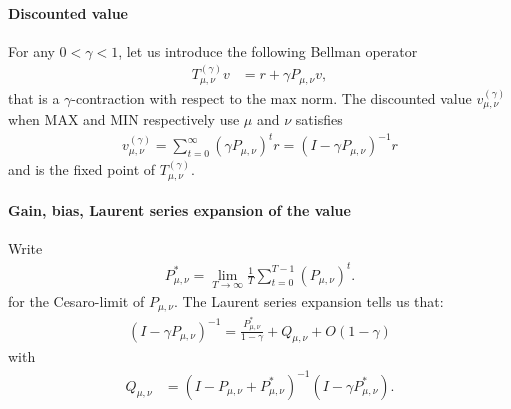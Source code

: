 \documentclass{article}
\begin{document}
\paragraph{Discounted value}

For any $0<\gamma<1$, let us introduce the following Bellman operator
\begin{align}
  T^{(\gamma)}_{\mu,\nu}v &= r + \gamma P_{\mu,\nu}v,%
\end{align}
that is a $\gamma$-contraction with respect to the max norm.
The discounted value $v^{(\gamma)}_{\mu,\nu}$ when MAX and MIN respectively use $\mu$ and $\nu$ satisfies
\begin{align}
  v^{(\gamma)}_{\mu,\nu} = \sum_{t=0}^{\infty} (\gamma P_{\mu,\nu})^t r = (I-\gamma P_{\mu,\nu})^{-1} r
\end{align}
and is the fixed point of $T^{(\gamma)}_{\mu,\nu}$.

\paragraph{Gain, bias, Laurent series expansion of the value} 

Write
\begin{align}
P_{\mu,\nu}^* = \lim_{T \to \infty} \frac{1}{T}\sum_{t=0}^{T-1} (P_{\mu,\nu})^t. 
\end{align}
for the Cesaro-limit of $P_{\mu,\nu}$.
The Laurent series expansion \cite[Appendix A]{puterman} tells us that: 
\begin{align}
(I-\gamma P_{\mu,\nu})^{-1} = \frac{P^*_{\mu,\nu}}{1-\gamma} + Q_{\mu,\nu} + O(1-\gamma)
\end{align}
with
\begin{align}
Q_{\mu,\nu} & = (I- P_{\mu,\nu} + P^*_{\mu,\nu})^{-1} (I-\gamma P_{\mu,\nu}^*).
\end{align}
\end{document}
